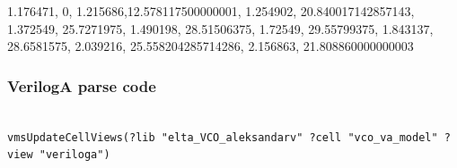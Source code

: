 {{1.176471, 0}, {1.215686,12.578117500000001}, {1.254902, 20.840017142857143}, {1.372549, 25.7271975}, {1.490198, 28.51506375}, {1.72549, 29.55799375}, {1.843137, 28.6581575}, {2.039216, 25.558204285714286}, {2.156863, 21.808860000000003}}

\subsubsection*{VerilogA parse code}

\begin{verbatim}

vmsUpdateCellViews(?lib "elta_VCO_aleksandarv" ?cell "vco_va_model" ?view "veriloga")
\end{verbatim}